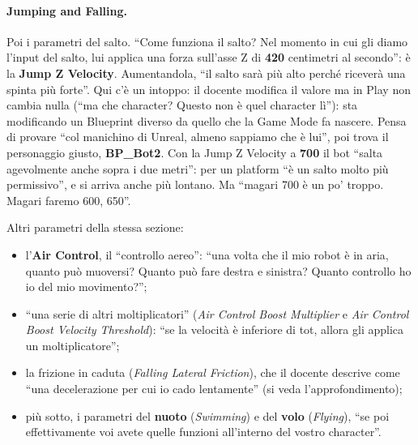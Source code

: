 \paragraph{Jumping and Falling.} Poi i parametri del salto. ``Come funziona il salto? Nel
momento in cui gli diamo l'input del salto, lui applica una forza sull'asse Z di
\textbf{420} centimetri al secondo'': è la \textbf{Jump Z Velocity}. Aumentandola, ``il
salto sarà più alto perché riceverà una spinta più forte''. Qui c'è un intoppo: il docente
modifica il valore ma in Play non cambia nulla (``ma che character? Questo non è quel
character lì''): sta modificando un Blueprint diverso da quello che la Game Mode fa
nascere. Pensa di provare ``col manichino di Unreal, almeno sappiamo che è lui'', poi
trova il personaggio giusto, \textbf{BP\_Bot2}. Con la Jump Z Velocity a \textbf{700} il bot
``salta agevolmente anche sopra i due metri'': per un platform ``è un salto molto più
permissivo'', e si arriva anche più lontano. Ma ``magari 700 è un po' troppo. Magari faremo
600, 650''.

Altri parametri della stessa sezione:
\begin{itemize}
  \item l'\textbf{Air Control}, il ``controllo aereo'': ``una volta che il mio robot è in
        aria, quanto può muoversi? Quanto può fare destra e sinistra? Quanto controllo ho
        io del mio movimento?'';
  \item ``una serie di altri moltiplicatori'' (\emph{Air Control Boost Multiplier} e
        \emph{Air Control Boost Velocity Threshold}): ``se la velocità è inferiore di tot,
        allora gli applica un moltiplicatore'';
  \item la frizione in caduta (\emph{Falling Lateral Friction}), che il docente descrive
        come ``una decelerazione per cui io cado lentamente'' (si veda l'approfondimento);
  \item più sotto, i parametri del \textbf{nuoto} (\emph{Swimming}) e del \textbf{volo}
        (\emph{Flying}), ``se poi effettivamente voi avete quelle funzioni all'interno del
        vostro character''.
\end{itemize}


